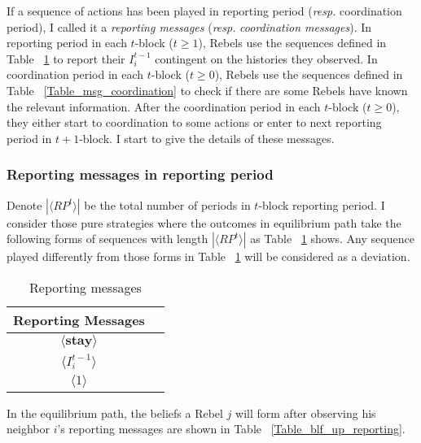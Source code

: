 \documentclass[12pt,letter]{article}
\theoremstyle{definition}
\theoremstyle{remark}
\theoremstyle{claim}
\begin{document}
If a sequence of actions has been played in reporting period (\textit{resp.} coordination period), I called it a \textit{reporting messages} (\textit{resp.} \textit{coordination messages}). In reporting period in each $t$-block ($t\geq 1$), Rebels use the sequences defined in Table ~\ref{Table_msg_reporting} to report their $I^{t-1}_i$ contingent on the histories they observed. In coordination period in each $t$-block ($t\geq 0$), Rebels use the sequences defined in Table ~\ref{Table_msg_coordination} to check if there are some Rebels have known the relevant information. After the coordination period in each $t$-block ($t\geq 0$), they either start to coordination to some actions or enter to next reporting period in $t+1$-block. I start to give the details of these messages.



\subsubsection*{Reporting messages in reporting period}

Denote $|\langle RP^t \rangle|$ be the total number of periods in $t$-block reporting period. I consider those pure strategies where the outcomes in equilibrium path take the following forms of sequences with length $|\langle RP^t \rangle|$ as Table ~\ref{Table_msg_reporting} shows. Any sequence played differently from those forms in Table ~\ref{Table_msg_reporting} will be considered as a deviation. 

\begin{table}[ht]
\caption{Reporting messages}
\label{Table_msg_reporting}
\begin{center}
\begin{tabular}{c c }
Reporting Messages 		&   \\
\hline
$\langle  \textbf{stay} \rangle$ 	& 	 \\
$\langle  {I^{t-1}_i} \rangle$ 		&   \\
$\langle 1 \rangle$ 		             &    
\end{tabular}
\end{center}
\end{table}
In the equilibrium path, the beliefs a Rebel $j$ will form after observing his neighbor $i$'s reporting messages are shown in Table ~\ref{Table_blf_up_reporting}.
\end{document}
